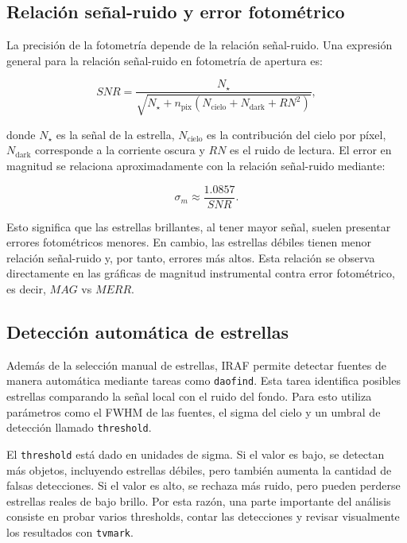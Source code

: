 \documentclass[12pt,letterpaper]{article}
\begin{document}
\subsection{Relación señal-ruido y error fotométrico}

La precisión de la fotometría depende de la relación señal-ruido. Una expresión general para la relación señal-ruido en fotometría de apertura es:

\begin{equation}
    SNR =
    \frac{N_{\star}}
    {
    \sqrt{
    N_{\star}
    + n_{\text{pix}}
    \left(
    N_{\text{cielo}} + N_{\text{dark}} + RN^2
    \right)
    }
    },
\end{equation}

donde $N_{\star}$ es la señal de la estrella, $N_{\text{cielo}}$ es la contribución del cielo por píxel, $N_{\text{dark}}$ corresponde a la corriente oscura y $RN$ es el ruido de lectura. El error en magnitud se relaciona aproximadamente con la relación señal-ruido mediante:

\begin{equation}
    \sigma_m \approx \frac{1.0857}{SNR}.
\end{equation}

Esto significa que las estrellas brillantes, al tener mayor señal, suelen presentar errores fotométricos menores. En cambio, las estrellas débiles tienen menor relación señal-ruido y, por tanto, errores más altos. Esta relación se observa directamente en las gráficas de magnitud instrumental contra error fotométrico, es decir, $MAG$ vs $MERR$.

\subsection{Detección automática de estrellas}

Además de la selección manual de estrellas, IRAF permite detectar fuentes de manera automática mediante tareas como \texttt{daofind}. Esta tarea identifica posibles estrellas comparando la señal local con el ruido del fondo. Para esto utiliza parámetros como el FWHM de las fuentes, el sigma del cielo y un umbral de detección llamado \texttt{threshold}.

El \texttt{threshold} está dado en unidades de sigma. Si el valor es bajo, se detectan más objetos, incluyendo estrellas débiles, pero también aumenta la cantidad de falsas detecciones. Si el valor es alto, se rechaza más ruido, pero pueden perderse estrellas reales de bajo brillo. Por esta razón, una parte importante del análisis consiste en probar varios thresholds, contar las detecciones y revisar visualmente los resultados con \texttt{tvmark}.
\end{document}
